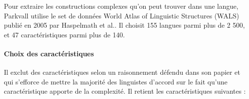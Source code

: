 \documentclass[a4paper, twoside]{article}
\begin{document}
    Pour extraire les \og constructions complexes  qu’on peut trouver dans une langue, Parkvall utilise le set de données World Atlas of Linguistic Structures (WALS) publié en 2005 par Haspelmath et al.. Il choisit 155 langues parmi plus de 2 500, et 47 caractéristiques parmi plus de 140.

    \paragraph{Choix des caractéristiques}

    Il exclut des caractéristiques selon un raisonnement défendu dans son papier et qui s’efforce de mettre la majorité des linguistes d’accord sur le fait qu’une caractéristique apporte de la complexité. Il retient les caractéristiques suivantes : \par
\end{document}
